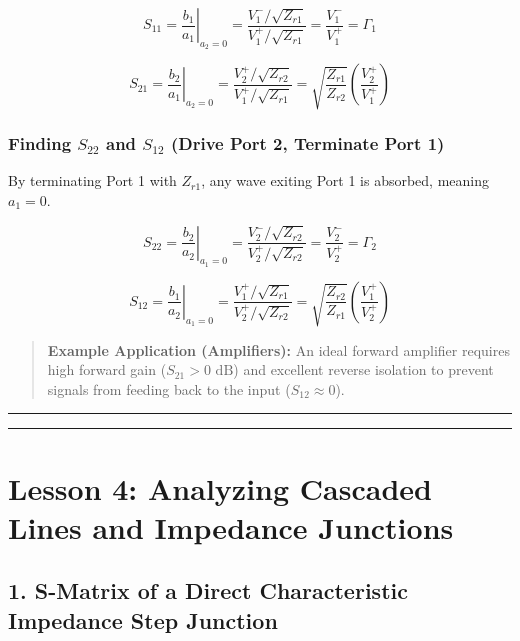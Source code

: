 \documentclass[
]{article}
\begin{document}
\[S_{11} = \left. \frac{b_1}{a_1} \right|_{a_2=0} = \frac{V_1^- / \sqrt{Z_{r1}}}{V_1^+ / \sqrt{Z_{r1}}} = \frac{V_1^-}{V_1^+} = \Gamma_1\]

\[S_{21} = \left. \frac{b_2}{a_1} \right|_{a_2=0} = \frac{V_2^+ / \sqrt{Z_{r2}}}{V_1^+ / \sqrt{Z_{r1}}} = \sqrt{\frac{Z_{r1}}{Z_{r2}}} \left( \frac{V_2^+}{V_1^+} \right)\]

\subsubsection{\texorpdfstring{Finding \(S_{22}\) and \(S_{12}\) (Drive
Port 2, Terminate Port
1)}{Finding S\_\{22\} and S\_\{12\} (Drive Port 2, Terminate Port 1)}}\label{finding-s_22-and-s_12-drive-port-2-terminate-port-1}

By terminating Port 1 with \(Z_{r1}\), any wave exiting Port 1 is
absorbed, meaning \(a_1 = 0\).

\[S_{22} = \left. \frac{b_2}{a_2} \right|_{a_1=0} = \frac{V_2^- / \sqrt{Z_{r2}}}{V_2^+ / \sqrt{Z_{r2}}} = \frac{V_2^-}{V_2^+} = \Gamma_2\]

\[S_{12} = \left. \frac{b_1}{a_2} \right|_{a_1=0} = \frac{V_1^+ / \sqrt{Z_{r1}}}{V_2^+ / \sqrt{Z_{r2}}} = \sqrt{\frac{Z_{r2}}{Z_{r1}}} \left( \frac{V_1^+}{V_2^+} \right)\]

\begin{quote}
\textbf{Example Application (Amplifiers):} An ideal forward amplifier
requires high forward gain (\(S_{21} > 0\text{ dB}\)) and excellent
reverse isolation to prevent signals from feeding back to the input
(\(S_{12} \approx 0\)).
\end{quote}

\begin{center}\rule{0.5\linewidth}{0.5pt}\end{center}

\begin{center}\rule{0.5\linewidth}{0.5pt}\end{center}

\section{Lesson 4: Analyzing Cascaded Lines and Impedance
Junctions}\label{lesson-4-analyzing-cascaded-lines-and-impedance-junctions}

\subsection{1. S-Matrix of a Direct Characteristic Impedance Step
Junction}\label{s-matrix-of-a-direct-characteristic-impedance-step-junction}
\end{document}
